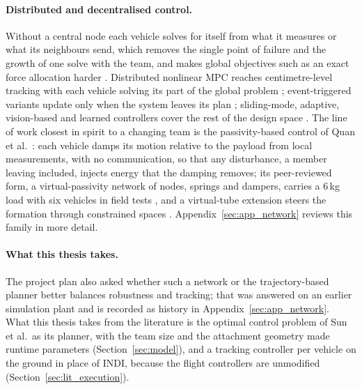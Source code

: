 \paragraph{Distributed and decentralised control.} Without a central node each vehicle solves for itself from
what it measures or what its neighbours send, which removes the single point of failure and the growth of one
solve with the team, and makes global objectives such as an exact force allocation harder
\cite{scattoliniArchitecturesDistributedHierarchical2009}. Distributed nonlinear MPC reaches centimetre-level
tracking with each vehicle solving its part of the global problem \cite{distributedNMPC}; event-triggered
variants update only when the system leaves its plan \cite{tasoojiEventTriggeredNonlinearModel,
tasoojiCooperativeControlMultiQuadrotors}; sliding-mode, adaptive, vision-based and learned controllers cover
the rest of the design space \cite{DFHSMC, arabPlanningDistributedControl2021, 9376103,
liMultiUAVCooperativeTransportation2021}. The line of work closest in spirit to a changing team is the passivity-based
control of Quan et al.\ \cite{quan2025swarm}: each vehicle damps its motion relative to the payload from local
measurements, with no communication, so that any disturbance, a member leaving included, injects energy that the
damping removes; its peer-reviewed form, a virtual-passivity network of nodes, springs and dampers, carries a
6\,kg load with six vehicles in field tests \cite{liu2026passivity}, and a virtual-tube extension steers the
formation through constrained spaces \cite{liuVirtualTubeBasedCooperativeTransport2026}. Appendix~\ref{sec:app_network}
reviews this family in more detail.

\paragraph{What this thesis takes.} The project plan also asked whether such a network or the trajectory-based
planner better balances robustness and tracking; that was answered on an earlier simulation plant and is recorded
as history in Appendix~\ref{sec:app_network}. What this thesis takes from the literature is the optimal control
problem of Sun et al.\ as its planner, with the team size and the attachment geometry made runtime parameters
(Section~\ref{sec:model}), and a tracking controller per vehicle on the ground in place of INDI, because the
flight controllers are unmodified (Section~\ref{sec:lit_execution}).
